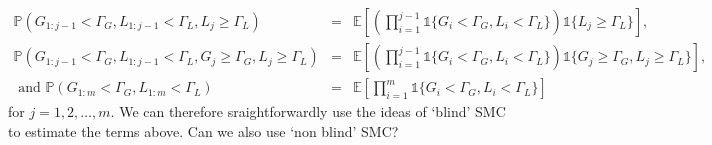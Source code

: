 \documentclass{article}
\begin{document}
\begin{eqnarray} 
\mathbb{P} ( G_{1:j-1} < \Gamma_{G}, L_{1:j-1} < \Gamma_{L}, L_{j} \geq \Gamma_{L} ) & = &  \mathbb{E} \left [ \left ( \prod_{i=1}^{j-1} \mathds{1} \{ G_{i} < \Gamma_{G}, L_{i} < \Gamma_{L} \} \right ) \mathds{1} \{ L_{j} \geq \Gamma_{L} \} \right ], \nonumber \\
\mathbb{P} ( G_{1:j-1} < \Gamma_{G}, L_{1:j-1} < \Gamma_{L}, G_{j} \geq \Gamma_{G}, L_{j} \geq \Gamma_{L} ) & = &  \mathbb{E} \left [ \left ( \prod_{i=1}^{j-1} \mathds{1} \{ G_{i} < \Gamma_{G}, L_{i} < \Gamma_{L} \} \right ) \mathds{1} \{  G_{j} \geq \Gamma_{G}, L_{j} \geq \Gamma_{L} \} \right ], \nonumber \\
\text{ and } \mathbb{P} ( G_{1:m} < \Gamma_{G}, L_{1:m} < \Gamma_{L} ) & = & \mathbb{E} \left [ \prod_{i=1}^{m} \mathds{1} \{ G_{i} < \Gamma_{G}, L_{i} < \Gamma_{L} \} \right ] \nonumber 
\end{eqnarray}
for $j = 1, 2, \ldots, m$. We can therefore sraightforwardly use the ideas of `blind' SMC to estimate the terms above. Can we also use `non blind' SMC?
\end{document}
